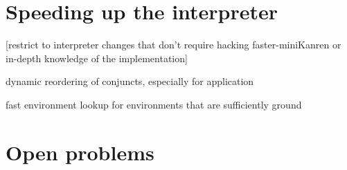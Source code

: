 \documentclass{book}
\begin{document}
\chapter{Speeding up the interpreter}%

[restrict to interpreter changes that don't require hacking faster-miniKanren or in-depth knowledge of the implementation]

dynamic reordering of conjuncts, especially for application

fast environment lookup for environments that are sufficiently ground


\chapter{Open problems}%


\appendix
\end{document}
